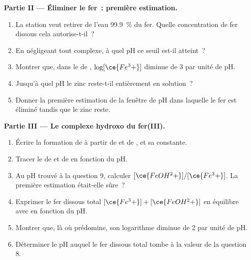 \begin{problem}
\medskip
\noindent\textbf{Partie II --- Éliminer le fer~: première estimation.}
\begin{enumerate}[resume]
  \item La station veut retirer de l'eau \qty{99.9}{\percent} du fer.
        Quelle concentration de fer dissous cela autorise-t-il~?
  \item En négligeant tout complexe, à quel pH ce seuil est-il atteint~?
  \item Montrer que, dans le  de ,
        $\log[\ce{Fe^3+}]$ diminue de 3 par unité de pH.
  \item Jusqu'à quel pH le zinc reste-t-il entièrement en solution~?
  \item Donner la première estimation de la fenêtre de pH dans laquelle
        le fer est éliminé tandis que le zinc reste.
\end{enumerate}

\medskip
\noindent\textbf{Partie III --- Le complexe hydroxo du fer(III).}
\begin{enumerate}[resume]
  \item Écrire la formation de  à partir de  et de
        , et sa constante.
  \item Tracer le  de  et de
         en fonction du pH.
  \item Au pH trouvé à la question 9, calculer
        $[\ce{FeOH^2+}]/[\ce{Fe^3+}]$. La première estimation était-elle
        sûre~?
  \item Exprimer le fer dissous total $[\ce{Fe^3+}] + [\ce{FeOH^2+}]$ en
        équilibre avec  en fonction du pH.
  \item Montrer que, là où  prédomine, son logarithme
        diminue de 2 par unité de pH.
  \item Déterminer le pH auquel le fer dissous total tombe à la valeur de
        la question 8.
\end{enumerate}


\end{problem}
